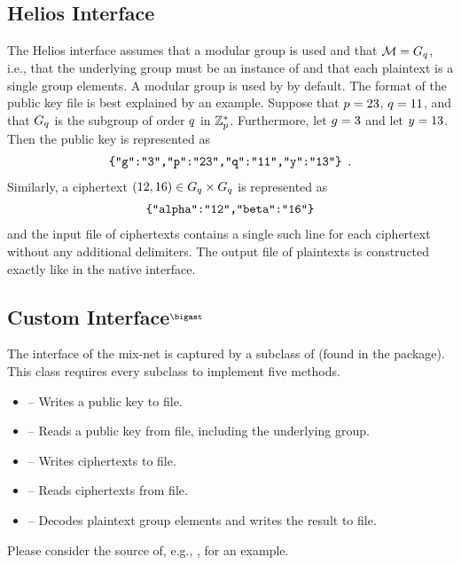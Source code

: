 \documentclass[11pt]{article}
\newcommand{\MARK}{$^\bigast$}
\begin{document}
\subsection{Helios Interface}

The Helios interface assumes that a modular group is used and that
$\mathcal{M}=G_{q}$, i.e., that the underlying group must be an instance of
 and that each plaintext is a
single group elements. A modular group is used by \vmni{} by
default. The format of the public key file is best explained by an
example. Suppose that $p=23$, $q=11$, and that $G_{q}$ is the subgroup
of order $q$ in $\mathbb{Z}_{p}^*$. Furthermore, let $g=3$ and let
$y=13$. Then the public key is represented as
\begin{align*}
  \texttt{\{"g":"3","p":"23","q":"11","y":"13"\}}\enspace.
\end{align*}
Similarly, a ciphertext $(12,16)\in G_{q}\times G_{q}$ is represented as
\begin{align*}
  \texttt{\{"alpha":"12","beta":"16"\}}
\end{align*}
and the input file of ciphertexts contains a single such line for each
ciphertext without any additional delimiters. The output file of
plaintexts is constructed exactly like in the native interface.

\subsection{Custom Interface\MARK}

The interface of the mix-net is captured by a subclass of
 (found in the
 package). This class requires every
subclass to implement five methods.
\begin{itemize}

\item {} -- Writes a public key to file.

\item {} -- Reads a public key from file, including
  the underlying group.
  
\item {} -- Writes ciphertexts to file.

\item {} -- Reads ciphertexts from file.

\item {} -- Decodes plaintext group elements and
  writes the result to file.

\end{itemize}
Please consider the source of, e.g.,
, for an example.
\end{document}
